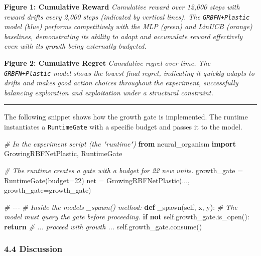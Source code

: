 \documentclass[
]{article}
\newenvironment{Shaded}{}{}
\newcommand{\CommentTok}[1]{\textcolor[rgb]{0.38,0.63,0.69}{\textit{#1}}}
\newcommand{\ControlFlowTok}[1]{\textcolor[rgb]{0.00,0.44,0.13}{\textbf{#1}}}
\newcommand{\DecValTok}[1]{\textcolor[rgb]{0.25,0.63,0.44}{#1}}
\newcommand{\ImportTok}[1]{\textcolor[rgb]{0.00,0.50,0.00}{\textbf{#1}}}
\newcommand{\KeywordTok}[1]{\textcolor[rgb]{0.00,0.44,0.13}{\textbf{#1}}}
\newcommand{\NormalTok}[1]{#1}
\newcommand{\OperatorTok}[1]{\textcolor[rgb]{0.40,0.40,0.40}{#1}}
\newcommand{\VariableTok}[1]{\textcolor[rgb]{0.10,0.09,0.49}{#1}}
\begin{document}
\textbf{Figure 1: Cumulative Reward}
\emph{
Cumulative reward over 12,000 steps with reward drifts every 2,000 steps
(indicated by vertical lines). The \texttt{GRBFN+Plastic} model (blue)
performs competitively with the MLP (green) and LinUCB (orange)
baselines, demonstrating its ability to adapt and accumulate reward
effectively even with its growth being externally budgeted.}

\textbf{Figure 2: Cumulative Regret}
\emph{
Cumulative regret over time. The \texttt{GRBFN+Plastic} model shows the
lowest final regret, indicating it quickly adapts to drifts and makes
good action choices throughout the experiment, successfully balancing
exploration and exploitation under a structural constraint.}

\begin{center}\rule{0.5\linewidth}{0.5pt}\end{center}

The following snippet shows how the growth gate is implemented. The
runtime instantiates a \texttt{RuntimeGate} with a specific budget and
passes it to the model.

\begin{Shaded}
\begin{Highlighting}[]
\CommentTok{\# In the experiment script (the "runtime")}
\ImportTok{from}\NormalTok{ neural_organism }\ImportTok{import}\NormalTok{ GrowingRBFNetPlastic, RuntimeGate}

\CommentTok{\# The runtime creates a gate with a budget for 22 new units.}
\NormalTok{growth\_gate }\OperatorTok{=}\NormalTok{ RuntimeGate(budget}\OperatorTok{=}\DecValTok{22}\NormalTok{)}
\NormalTok{net }\OperatorTok{=}\NormalTok{ GrowingRBFNetPlastic(..., growth\_gate}\OperatorTok{=}\NormalTok{growth\_gate)}

\CommentTok{\# {-}{-}{-}}
\CommentTok{\# Inside the model\textquotesingle{}s \_spawn() method:}
\KeywordTok{def}\NormalTok{ \_spawn(}\VariableTok{self}\NormalTok{, x, y):}
    \CommentTok{\# The model must query the gate before proceeding.}
    \ControlFlowTok{if} \KeywordTok{not} \VariableTok{self}\NormalTok{.growth\_gate.is\_open():}
        \ControlFlowTok{return}
    \CommentTok{\# ... proceed with growth ...}
    \VariableTok{self}\NormalTok{.growth\_gate.consume()}
\end{Highlighting}
\end{Shaded}

\hypertarget{discussion}{%
\subsubsection{4.4 Discussion}\label{discussion}}
\end{document}
